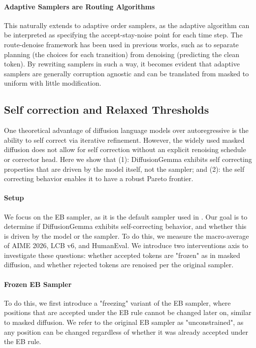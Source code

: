 \paragraph{Adaptive Samplers are Routing Algorithms}
This naturally extends to adaptive order samplers, as the adaptive algorithm can be interpreted as specifying the accept-stay-noise point for each time step.
The route-denoise framework has been used in previous works, such as \citet{liu2025think} to separate planning (the choices for each transition) from denoising (predicting the clean token).
By rewriting samplers in such a way, it becomes evident that adaptive samplers are generally corruption agnostic and can be translated from masked to uniform with little modification.

\subsection{Self correction and Relaxed Thresholds}
One theoretical advantage of diffusion language models over autoregressive is the ability to self correct via iterative refinement.
However, the widely used masked diffusion does not allow for self correction without an explicit renoising schedule or corrector head.
Here we show that (1): DiffusionGemma exhibits self correcting properties that are driven by the model itself, not the sampler; and (2): the self correcting behavior enables it to have a robust Pareto frontier. 

\paragraph{Setup}
We focus on the EB sampler, as it is the default sampler used in \citet{team2026diffusiongemma}.
Our goal is to determine if DiffusionGemma exhibits self-correcting behavior, and whether this is driven by the model or the sampler.
To do this, we measure the macro-average of AIME 2026, LCB v6, and HumanEval.
We introduce two interventions axis to investigate these questions: whether accepted tokens are "frozen" as in masked diffusion, and whether rejected tokens are renoised per the original sampler.

\paragraph{Frozen EB Sampler}
To do this, we first introduce a "freezing" variant of the EB sampler, where positions that are accepted under the EB rule cannot be changed later on, similar to masked diffusion. 
We refer to the original EB sampler as "unconstrained", as any position can be changed regardless of whether it was already accepted under the EB rule.

